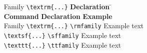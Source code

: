 \documentclass{article}
\newcommand{\head}[1]{\textbf{#1}}
\begin{document}
\begin{tabbing}
Family \= \verb|\textrm{...}| \= \head{Declaration} \= \kill\\
  \> \head{Command} \> \head{Declaration} \> \head{Example}\\
Family \> \verb|\textrm{...}| \> \verb|\rmfamily| \> \rmfamily Example text\\
  \> \verb|\textsf{...}| \> \verb|\sffamily| \> \sffamily Example text\\
  \> \verb|\texttt{...}| \> \verb|\ttfamily| \> \ttfamily Example text
\end{tabbing}
\end{document}
